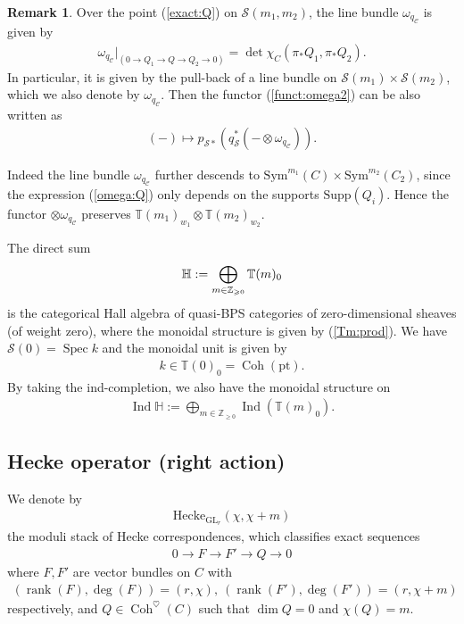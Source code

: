 \documentclass [11pt,oneside,a4paper,mathscr]{amsart}
\theoremstyle{definition}
\newtheorem{remark}[thm]{Remark}
\renewcommand{\geq}{\geqslant}
\newcommand{\rank}{\operatorname{rank}}
\newcommand{\Coh}{\operatorname{Coh}}
\newcommand{\Ind}{\operatorname{Ind}}
\newcommand{\Spec}{\operatorname{Spec}}
\newcommand{\GL}{\operatorname{GL}}
\begin{document}
\begin{remark}
Over the point (\ref{exact:Q}) on $\mathcal{S}(m_1, m_2)$, 
the line bundle $\omega_{q_{\mathcal{C}}}$ is given by 
\begin{align}\label{omega:Q}
    \omega_{q_{\mathcal{C}}}|_{(0\to Q_1 \to Q\to Q_2 \to 0)}
    =\det \chi_C(\pi_{*}Q_1, \pi_{*}Q_2).
\end{align}
In particular, it is given by the pull-back of a line bundle on 
$\mathcal{S}(m_1)\times \mathcal{S}(m_2)$, which we also denote by 
$\omega_{q_{\mathcal{C}}}$. Then the functor (\ref{funct:omega2}) can be also written as 
\begin{align*}
(-)\mapsto 
    p_{\mathcal{S}\ast}(q_{\mathcal{S}}^{\ast}(- \otimes \omega_{q_{\mathcal{C}}})).  
\end{align*}

Indeed the line bundle $\omega_{q_{\mathcal{C}}}$ 
further descends to $\mathrm{Sym}^{m_1}(C) \times \mathrm{Sym}^{m_2}(C_2)$, since 
the expression (\ref{omega:Q}) only depends on the supports $\mathrm{Supp}(Q_i)$. 
Hence the functor $\otimes \omega_{q_{\mathcal{C}}}$ preserves $\mathbb{T}(m_1)_{w_1}\otimes \mathbb{T}(m_2)_{w_2}$.
    \end{remark}
The direct sum
\begin{align}\notag
    \mathbb{H}:=\bigoplus_{m\in \mathbb{Z}_{\geq 0}}\mathbb{T}(m)_0
\end{align}
is the categorical Hall algebra of quasi-BPS categories
of zero-dimensional sheaves (of weight zero), 
where the monoidal structure is given by (\ref{Tm:prod}). 
We have $\mathcal{S}(0)=\Spec k$ and 
the monoidal unit is given by 
\begin{align*}
    k \in \mathbb{T}(0)_0=\Coh(\mathrm{pt}).
\end{align*}
By taking the ind-completion, we also have the monoidal 
structure on 
\begin{align*}
\Ind \mathbb{H}:=\bigoplus_{m \in \mathbb{Z}_{\geq 0}}\Ind(\mathbb{T}(m)_0). 
\end{align*}


\subsection{Hecke operator (right action)}\label{subsec:Hecke}
We denote by 
\begin{align*}\mathrm{Hecke}_{\GL_r}(\chi, \chi+m)
\end{align*}
the moduli stack of Hecke correspondences, 
which classifies exact sequences
\begin{align}\label{ex:heart}
    0 \to F \to F' \to Q \to 0
\end{align}
where $F, F'$ are vector bundles on $C$ with 
\begin{align*}(\rank(F), \deg(F))=(r, \chi), \
(\rank(F'), \deg(F'))=(r, \chi+m)
\end{align*}
respectively, 
and $Q \in \Coh^{\heartsuit}(C)$ such that $\dim Q=0$ and 
$\chi(Q)=m$. 
\end{document}
